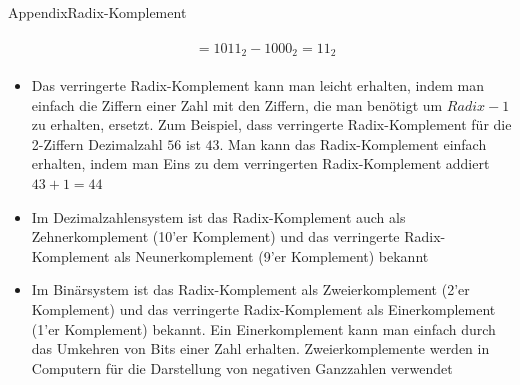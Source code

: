\begin{frame}[allowframebreaks]{Appendix}{Radix-Komplement}
\begin{itemize}
\begin{align*}
\begin{aligned}
                                                                                             &= 1011_{2} - 1000_{2} = 11_{2}
                    \end{aligned}
            \end{align*}
  \end{itemize}
    \begin{Sidenote}
      \begin{itemize}
        \item Das \alert{verringerte Radix-Komplement} kann man leicht erhalten, indem man einfach die Ziffern einer Zahl mit den Ziffern, die man benötigt um $Radix - 1$ zu erhalten, ersetzt. Zum Beispiel, dass verringerte Radix-Komplement für die 2-Ziffern Dezimalzahl $56$ ist $43$. Man kann das \alert{Radix-Komplement} einfach erhalten, indem man Eins zu dem verringerten Radix-Komplement addiert $43+1=44$
        \item Im Dezimalzahlensystem ist das Radix-Komplement auch als \alert{Zehnerkomplement} (10'er Komplement) und das verringerte Radix-Komplement als \alert{Neunerkomplement} (9'er Komplement) bekannt
        \item Im Binärsystem ist das Radix-Komplement als \alert{Zweierkomplement} (2'er Komplement) und das verringerte Radix-Komplement als \alert{Einerkomplement} (1'er Komplement) bekannt. Ein Einerkomplement kann man einfach durch das Umkehren von Bits einer Zahl erhalten. Zweierkomplemente werden in Computern für die Darstellung von negativen Ganzzahlen verwendet
      \end{itemize}
    \end{Sidenote}
\end{frame}

